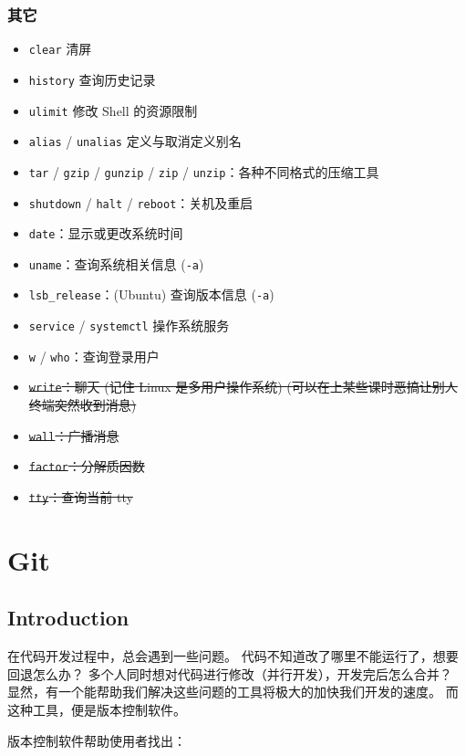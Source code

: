 \documentclass{article}
\begin{document}
	\subsubsection{其它}

	\begin{itemize}
		\itemsep0pt
		\item \texttt{clear} 清屏
		\item \texttt{history} 查询历史记录
		\item \texttt{ulimit} 修改 Shell 的资源限制
		\item \texttt{alias} / \texttt{unalias} 定义与取消定义别名
		\item \texttt{tar} / \texttt{gzip} / \texttt{gunzip} / \texttt{zip} / \texttt{unzip}：各种不同格式的压缩工具
		\item \texttt{shutdown} / \texttt{halt} / \texttt{reboot}：关机及重启
		\item \texttt{date}：显示或更改系统时间
		\item \texttt{uname}：查询系统相关信息 (\texttt{-a})
		\item \texttt{lsb\_release}：(Ubuntu) 查询版本信息 (\texttt{-a})
		\item \texttt{service} / \texttt{systemctl} 操作系统服务
		\item \texttt w / \texttt{who}：查询登录用户
		\item \sout{\texttt{write}：聊天 (记住 Linux 是多用户操作系统) (可以在上某些课时恶搞让别人终端突然收到消息)}
		\item \sout{\texttt{wall}：广播消息}
		\item \sout{\texttt{factor}：分解质因数}
		\item \sout{\texttt{tty}：查询当前 tty}
	\end{itemize}

	\section{Git}

	\subsection{Introduction}

	在代码开发过程中，总会遇到一些问题。
	代码不知道改了哪里不能运行了，想要回退怎么办？
	多个人同时想对代码进行修改（并行开发），开发完后怎么合并？
	显然，有一个能帮助我们解决这些问题的工具将极大的加快我们开发的速度。
	而这种工具，便是版本控制软件。

	版本控制软件帮助使用者找出：
\end{document}
